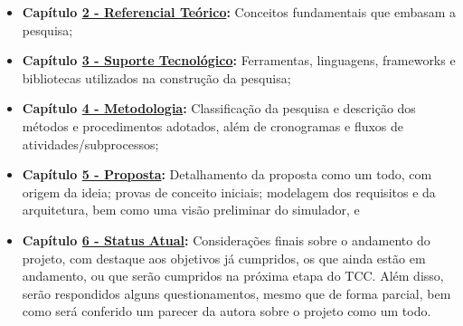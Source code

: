 \begin{itemize}
    \item \textbf{Capítulo \hyperref[cap-referencial-teorico]{2 - Referencial Teórico}:} Conceitos fundamentais que embasam a pesquisa;
    \item \textbf{Capítulo \hyperref[cap-suporte-tecnologico]{3 - Suporte Tecnológico}:} Ferramentas, linguagens, frameworks e bibliotecas utilizados na construção da pesquisa;
    \item \textbf{Capítulo \hyperref[cap-metodologia]{4 - Metodologia}:} Classificação da pesquisa e descrição dos métodos e procedimentos adotados, além de cronogramas e fluxos de atividades/subprocessos;
    \item \textbf{Capítulo \hyperref[cap-proposta]{5 - Proposta}:} Detalhamento da proposta como um todo, com origem da ideia; provas de conceito iniciais; modelagem dos requisitos e da arquitetura, bem como uma visão preliminar do simulador, e %
    \item \textbf{Capítulo \hyperref[cap-status-atual]{6 - Status Atual}:} Considerações finais sobre o andamento do projeto, com destaque aos objetivos já cumpridos, os que ainda estão em andamento, ou que serão cumpridos na próxima etapa do TCC. Além disso, serão respondidos alguns questionamentos, mesmo que de forma parcial, bem como será conferido um parecer da autora sobre o projeto como um todo.
\end{itemize}
